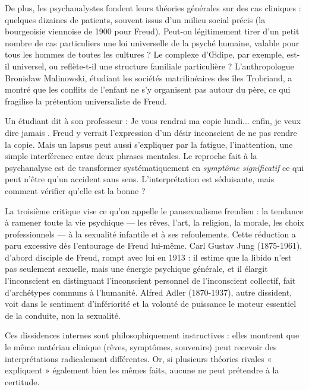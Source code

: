 \documentclass[11pt]{article}
\newcommand{\cle}[1]{{\popxbold\color{popdark}#1}}
\newcounter{popsec}
\newcounter{popsub}
\newcommand{\courssub}[1]{%
  \stepcounter{popsub}%
  \par\vspace{9pt}\noindent{\popxbold\fontsize{11.5}{13}\selectfont\color{popink}{\color{poporange}\thepopsec.\thepopsub}\hspace{6pt}#1}\par\nopagebreak\vspace{4pt}
}
\begin{document}
De plus, les psychanalystes fondent leurs théories générales sur des \cle{cas cliniques} : quelques dizaines de patients, souvent issus d'un milieu social précis (la bourgeoisie viennoise de 1900 pour Freud). Peut-on légitimement tirer d'un petit nombre de cas particuliers une loi universelle de la psyché humaine, valable pour tous les hommes de toutes les cultures ? Le complexe d'Œdipe, par exemple, est-il universel, ou reflète-t-il une structure familiale particulière ? L'anthropologue Bronisław Malinowski, étudiant les sociétés matrilinéaires des îles Trobriand, a montré que les conflits de l'enfant ne s'y organisent pas autour du père, ce qui fragilise la prétention universaliste de Freud.

\begin{exemplebox}
Un étudiant dit à son professeur : \guillemotleft Je vous rendrai ma copie lundi... enfin, je veux dire jamais \guillemotright. Freud y verrait l'expression d'un désir inconscient de ne pas rendre la copie. Mais un lapsus peut aussi s'expliquer par la fatigue, l'inattention, une simple interférence entre deux phrases mentales. Le reproche fait à la psychanalyse est de transformer systématiquement en \emph{symptôme significatif} ce qui peut n'être qu'un accident sans sens. L'interprétation est séduisante, mais comment vérifier qu'elle est la bonne ?
\end{exemplebox}

\courssub{La critique du pansexualisme}

La troisième critique vise ce qu'on appelle le \cle{pansexualisme} freudien : la tendance à ramener toute la vie psychique — les rêves, l'art, la religion, la morale, les choix professionnels — à la \cle{sexualité infantile} et à ses refoulements. Cette réduction a paru excessive dès l'entourage de Freud lui-même. Carl Gustav \cle{Jung} (1875-1961), d'abord disciple de Freud, rompt avec lui en 1913 : il estime que la libido n'est pas seulement sexuelle, mais une énergie psychique générale, et il élargit l'inconscient en distinguant l'inconscient personnel de l'\cle{inconscient collectif}, fait d'archétypes communs à l'humanité. Alfred \cle{Adler} (1870-1937), autre dissident, voit dans le sentiment d'infériorité et la volonté de puissance le moteur essentiel de la conduite, non la sexualité.

Ces dissidences internes sont philosophiquement instructives : elles montrent que le même matériau clinique (rêves, symptômes, souvenirs) peut recevoir des interprétations radicalement différentes. Or, si plusieurs théories rivales « expliquent » également bien les mêmes faits, aucune ne peut prétendre à la certitude.
\end{document}

